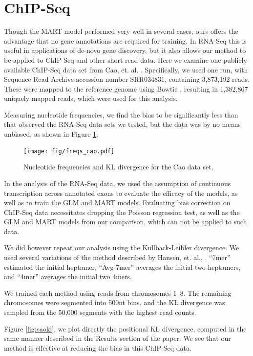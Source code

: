 \documentclass[letterpaper]{article}
\begin{document}
\section{ChIP-Seq}

Though the MART model \cite{Li2010} performed very well in several cases, ours
offers the advantage that no gene annotations are required for training.  In
RNA-Seq this is useful in applications of de-novo gene discovery, but it also
allows our method to be applied to ChIP-Seq and other short read data. Here we
examine one publicly available ChIP-Seq data set from Cao, et. al.
\cite{Cao2010}. Specifically, we used one run, with Sequence Read Archive
accession number SRR034831, containing 3,873,192 reads. These were mapped to the
reference genome using Bowtie \cite{Langmead2009}, resulting in 1,382,867
uniquely mapped reads, which were used for this analysis.

Measuring nucleotide frequencies, we find the bias to be significantly less
than that observed the RNA-Seq data sets we tested, but the data was by no means
unbiased, as shown in Figure \ref{fig:freqscao}.

\begin{figure}[H]
\begin{center}
\texttt{[image: fig/freqs\_cao.pdf]}
\end{center}
\caption{Nucleotide frequencies and KL divergence for the Cao data set.}
\label{fig:freqscao}
\end{figure}

In the analysis of the RNA-Seq data, we used the assumption of continuous
transcription across annotated exons to evaluate the efficacy of the models, as
well as to train the GLM and MART models. Evaluating bias correction on ChIP-Seq
data necessitates dropping the Poisson regression test, as well as the GLM and
MART models from our comparison, which can not be applied to such data.

We did however repeat our analysis using the Kullback-Leibler divergence.
We used several variations of the method described by Hansen, et. al.,
\cite{Hansen2010}. ``7mer'' estimated the initial heptamer, ``Avg-7mer''
averages the initial two heptamers, and ``4mer'' averages the initial two 4mers.

We trained each method using reads from chromosomes 1--8. The
remaining chromosomes were segmented into 500nt bins, and the KL divergence was
sampled from the 50,000 segments with the highest read counts.

Figure \ref{fig:caokl}, we plot directly the positional KL divergence, computed
in the same manner described in the Results section of the paper.  We see that
our method is effective at reducing the bias in this ChIP-Seq data.
\end{document}
